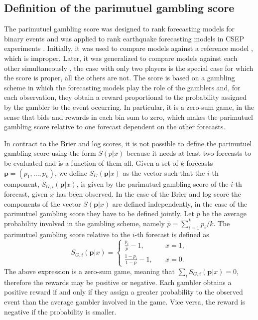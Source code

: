 \documentclass[referee,sn-basic]{sn-jnl}
\theoremstyle{thmstyleone}%
\theoremstyle{thmstyletwo}%
\theoremstyle{thmstylethree}%
\begin{document}
\subsection{Definition of the parimutuel gambling score}
\label{sec:defPG}

The parimutuel gambling score was designed to rank forecasting models for binary events and was applied to rank earthquake forecasting models in CSEP experiments \citep{taroni2018prospective, zechar2010risk}. Initially, it was used to compare models against a reference model  \citep{zhuang2010}, which is improper. Later, it was generalized to compare models against each other simultaneously \citep{zechar2014}, the case with only two players is the special case for which the score is proper, all the others are not. The score is based on a gambling scheme in which the forecasting models play the role of the gamblers and, for each observation, they obtain a reward proportional to the probability assigned by the gambler to the event occurring. In particular, it is a zero-sum game, in the sense that bids and rewards in each bin sum to zero, which makes the parimutuel gambling score relative to one forecast dependent on the other forecasts. 

In contract to the Brier and log scores, it is not possible to define the parimutuel gambling score using the form $S(p\vert x)$ because it needs at least two forecasts to be evaluated and is a function of them all. Given a set of $k$ forecasts $\mathbf p = (p_1,...,p_k)$, we define $S_G(\mathbf p\vert x)$ as the vector such that the $i$-th component, $S_{G,i}(\mathbf p\vert x)$, is given by the parimutuel gambling score of the $i$-th forecast, given $x$ has been observed. In the case of the Brier and log score the components of the vector $S(\mathbf p\vert x)$ are defined independently, in the case of the parimutuel gambling score they have to be defined jointly. Let $\bar p$  be the average probability involved in the gambling scheme, namely $\bar p = \sum_{i = 1}^k p_i/k$. The parimutuel gambling score relative to the $i$-th forecast is defined as
$$
S_{G,i}(\mathbf p\vert  x) = 
\begin{cases}
\frac{p_i}{\overline{p} } - 1, \quad & x = 1, \\
\frac{1 - p_i}{1 - \overline{p} } - 1, \quad & x = 0.
\end{cases}
$$
The above expression is a zero-sum game, meaning that $\sum_i S_{G,i}(\mathbf p\vert x) = 0$, therefore the rewards may be positive or negative. Each gambler obtains a positive reward if and only if they assign a greater probability to the observed event than the average gambler involved in the game. Vice versa, the reward is negative if the probability is smaller. 
\end{document}
